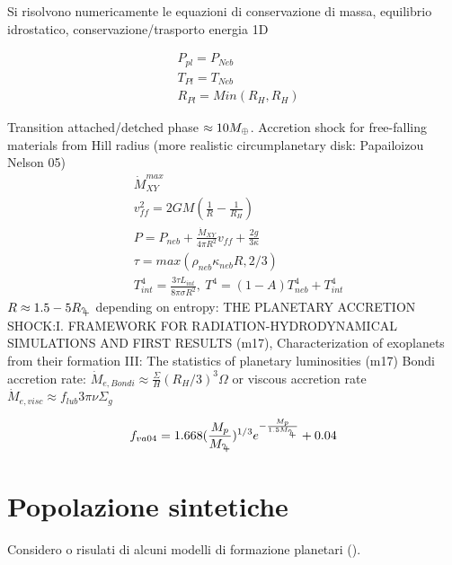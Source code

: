 Si risolvono numericamente le equazioni di conservazione di massa, equilibrio idrostatico, conservazione/trasporto energia 1D

\begin{workout}
\begin{align}
&P_{pl}=P_{Neb}\\
&T_{Pl}=T_{Neb}\\
&R_{Pl}=Min(R_H,R_H)
\end{align}
\end{workout}


\begin{workout}
Transition attached/detched phase $\approx10M_{\oplus}{}$.
Accretion shock for free-falling materials from Hill radius (more realistic circumplanetary disk: Papailoizou Nelson 05)
\begin{align}
&\dot{M}_{XY}^{max}\\
&v_{ff}^2=2GM(\frac{1}{R}-\frac{1}{R_H})\\
&P=P_{neb}+\frac{\dot{M}_{XY}}{4\pi R^2}v_{ff}+\frac{2g}{3\kappa}\\
&\tau=max(\rho_{neb}\kappa_{neb}R,2/3)\\
&T^4_{int}=\frac{3\tau L_{int}}{8\pi\sigma R^2},\ T^4=(1-A)T_{neb}^4+T_{int}^4
\end{align}
$R\approx1.5-5\rjupiter{}$ depending on entropy: THE PLANETARY ACCRETION SHOCK:I. FRAMEWORK FOR RADIATION-HYDRODYNAMICAL SIMULATIONS AND FIRST RESULTS (m17), Characterization of exoplanets from their formation III: The statistics of planetary luminosities (m17)
Bondi accretion rate: $\dot{M}_{e, Bondi}\approx\frac{\Sigma}{H}(R_H/3)^3\Omega$ or viscous accretion rate $\dot{M}_{e, visc}\approx f_{lub}3\pi\nu\Sigma_g$
\end{workout}

\begin{workout}
\begin{equation}
f_{va04}=1.668(\frac{M_p}{\mjupiter{}})\expy{1/3}\exp{-\frac{M_p}{1.5\mjupiter{}}}+0.04
\end{equation}
\end{workout}

\section{Popolazione sintetiche}

Considero o risulati di alcuni modelli di formazione planetari (\cite{mordasini2018planetary}). 

